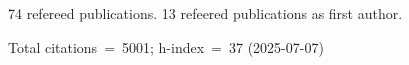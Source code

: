 74 refereed publications. 13 refeered publications as first author.

Total citations~=~5001; h-index~=~37 (2025-07-07)